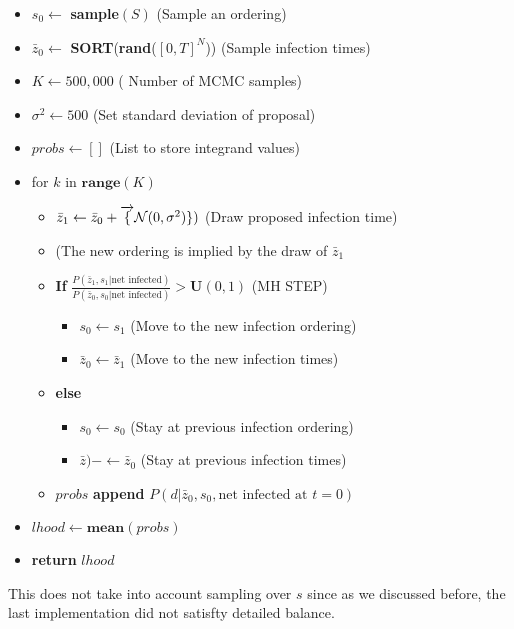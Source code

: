\documentclass{article}
\begin{document}
\begin{itemize}
\item $s_0 \leftarrow $ \textbf{sample}$(S)$ (Sample an ordering)
\item $\bar{z}_0 \leftarrow$ \textbf{SORT}(\textbf{rand}($[0, T]^N$)) (Sample infection times)
\item $K \leftarrow 500,000$ ( Number of MCMC samples)
\item $\sigma^2 \leftarrow 500$ (Set standard deviation of proposal)
\item $probs \leftarrow []$ (List to store integrand values)
\item for $k$ in $\textbf{range}(K)$
\begin{itemize}
\item $\bar{z}_1 \leftarrow  \bar{z}_0 + \overrightarrow\{\mathcal{N}(0, \sigma^2)\})$ (Draw proposed infection time)
\item (The new ordering is implied by the draw of $\bar{z}_1$
\item \textbf{If} $\frac{P(\bar{z}_1, s_1 | \text{net infected})}{P(\bar{z}_0, s_0 | \text{net infected})} > \mathbf{U}(0,1)$ (MH STEP)
\begin{itemize}
\item $s_0 \leftarrow s_1$ (Move to the new infection ordering)
\item $\bar{z}_0  \leftarrow \bar{z}_1$ (Move to the new infection times)
\end{itemize}
\item \textbf{else}
\begin{itemize}
\item $s_0 \leftarrow s_0$ (Stay at previous infection ordering)
\item $\bar{z})- \leftarrow \bar{z}_0$     (Stay at previous infection times)
\end{itemize}
\item $probs$ \textbf{append} $P(d | \bar{z}_0, s_0,  \text{net infected at } t=0)$
\end{itemize}
\item $lhood \leftarrow \textbf{mean}(probs)$
\item \textbf{return }$lhood$
\end{itemize}

This does not take into account sampling over $s$ since as we discussed before, the last implementation did not satisfty detailed balance.

\end{document}
